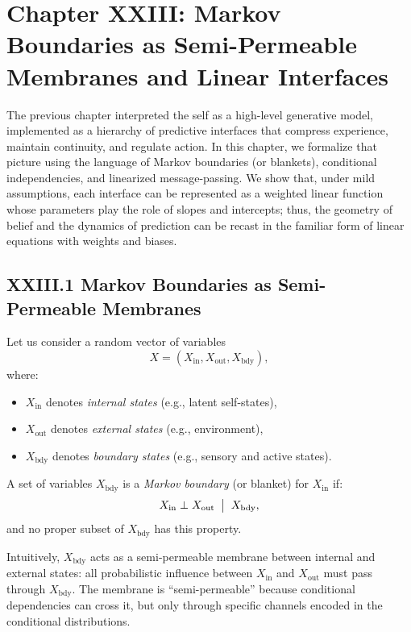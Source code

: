 \documentclass[11pt,letterpaper]{article}
\begin{document}
\newpage
\section{Chapter XXIII: Markov Boundaries as Semi-Permeable Membranes and Linear Interfaces}

The previous chapter interpreted the self as a high-level generative model, implemented as a hierarchy of predictive interfaces that compress experience, maintain continuity, and regulate action. In this chapter, we formalize that picture using the language of Markov boundaries (or blankets), conditional independencies, and linearized message-passing. We show that, under mild assumptions, each interface can be represented as a weighted linear function whose parameters play the role of slopes and intercepts; thus, the geometry of belief and the dynamics of prediction can be recast in the familiar form of linear equations with weights and biases.

\subsection{XXIII.1 Markov Boundaries as Semi-Permeable Membranes}

Let us consider a random vector of variables
\[
X = (X_{\text{in}}, X_{\text{out}}, X_{\text{bdy}}),
\]
where:

\begin{itemize}
  \item $X_{\text{in}}$ denotes \emph{internal states} (e.g., latent self-states),
  \item $X_{\text{out}}$ denotes \emph{external states} (e.g., environment),
  \item $X_{\text{bdy}}$ denotes \emph{boundary states} (e.g., sensory and active states).
\end{itemize}

\begin{definition}
A set of variables $X_{\text{bdy}}$ is a \emph{Markov boundary} (or blanket) for $X_{\text{in}}$ if:
\[
X_{\text{in}} \perp X_{\text{out}} \;\bigm|\; X_{\text{bdy}},
\]
and no proper subset of $X_{\text{bdy}}$ has this property.
\end{definition}

Intuitively, $X_{\text{bdy}}$ acts as a semi-permeable membrane between internal and external states: all probabilistic influence between $X_{\text{in}}$ and $X_{\text{out}}$ must pass through $X_{\text{bdy}}$. The membrane is ``semi-permeable'' because conditional dependencies can cross it, but only through specific channels encoded in the conditional distributions.
\end{document}
